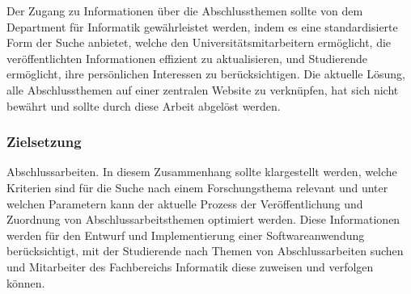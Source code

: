 Der Zugang zu Informationen über die Abschlussthemen sollte von dem Department für Informatik gewährleistet werden, indem es eine standardisierte Form der Suche anbietet, welche den Universitätsmitarbeitern ermöglicht, die veröffentlichten Informationen effizient zu aktualisieren, und Studierende ermöglicht, ihre persönlichen Interessen zu berücksichtigen. Die aktuelle Lösung, alle Abschlussthemen auf einer zentralen Website zu verknüpfen, hat sich nicht bewährt und sollte durch diese Arbeit abgelöst werden.

\newpage
\subsubsection{Zielsetzung}
Abschlussarbeiten. In diesem Zusammenhang sollte klargestellt werden, welche Kriterien sind für die Suche nach einem Forschungsthema relevant und unter welchen Parametern kann der aktuelle Prozess der Veröffentlichung und Zuordnung von Abschlussarbeitsthemen optimiert werden. Diese Informationen werden für den Entwurf und Implementierung einer Softwareanwendung berücksichtigt, mit der Studierende nach Themen von Abschlussarbeiten suchen und Mitarbeiter des Fachbereichs Informatik diese zuweisen und verfolgen können.